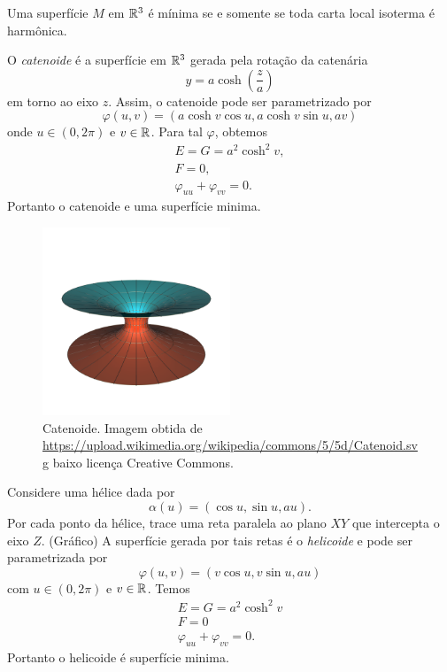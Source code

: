 \begin{corolario}\label{equiv_isoterma_harmonica}
	Uma superfície $M$ em $\mathbb{R}^3$ é mínima se e somente se toda carta local isoterma é harmônica.
\end{corolario}

\begin{exemplo}
	O \emph{catenoide} é a superfície em $\mathbb{R}^3$ gerada pela rotação da catenária 
	\begin{equation*}
	y = a \cosh \left( \frac{z}{a} \right)
	\end{equation*}
	em torno ao eixo $z$.
	Assim, o catenoide pode ser parametrizado por
	\begin{equation*}
	\varphi(u,v) = \left( a \cosh v \cos u, a \cosh v \sin u, av \right)
	\end{equation*}
	onde $u \in (0, 2 \pi)$ e $v \in \mathbb{R}$. Para tal $\varphi$, obtemos
	\begin{gather*}
	E = G = a^2 \cosh^2 v,\\
	F = 0,\\
	\varphi_{uu} + \varphi_{vv} = 0.
	\end{gather*}
	Portanto o catenoide e uma superfície minima.
\end{exemplo}

\begin{figure}
	\centering
	\includegraphics[width=0.5\textwidth]{images/catenoid}
	\caption{Catenoide. Imagem obtida de \url{https://upload.wikimedia.org/wikipedia/commons/5/5d/Catenoid.svg} baixo licença Creative Commons.}
\end{figure}

\begin{exemplo}
	Considere uma hélice dada por
	\begin{equation*}
	\alpha(u) = \left( \cos u, \sin u, au \right).
	\end{equation*}
	Por cada ponto da hélice, trace uma reta paralela ao plano $XY$ que intercepta o eixo $Z$.
	(Gráfico)
	A superfície gerada por tais retas é o \emph{helicoide} e pode ser parametrizada por
	\begin{equation*}
	\varphi(u,v) = \left( v \cos u, v \sin u, au \right)
	\end{equation*}
	com $u \in (0, 2 \pi)$ e $v \in \mathbb{R}$. Temos
	\begin{gather*}
	E = G = a^2 \cosh^2 v\\
	F = 0\\
	\varphi_{uu} + \varphi_{vv} = 0.
	\end{gather*}
	Portanto o helicoide é superfície minima.
\end{exemplo}

